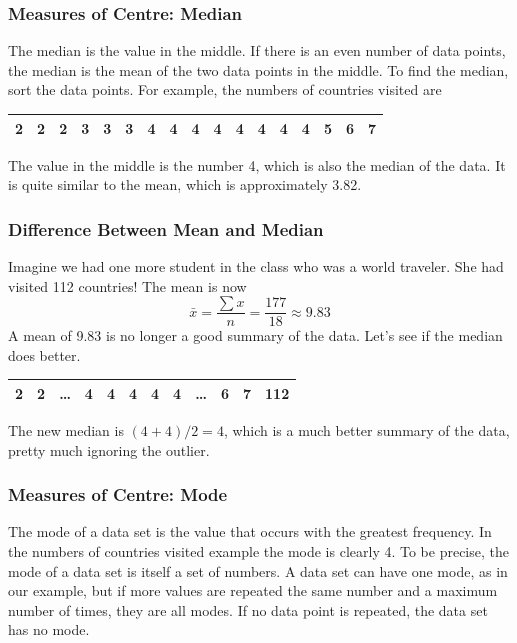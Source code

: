 \documentclass[xcolor=dvipsnames]{beamer}
\begin{document}
\begin{frame}
  \frametitle{Measures of Centre: Median}
The median is the value in the middle. If there is an even number of
data points, the median is the mean of the two data points in the
middle. To find the median, sort the data points. For example, the
numbers of countries visited are

\medskip

\begin{tabular}{|c|c|c|c|c|c|c|c|c|c|c|c|c|c|c|c|c|}\hline
2&2&2&3&3&3&4&4&\alert{4}&4&4&4&4&4&5&6&7 \\ \hline
\end{tabular}

\medskip

The value in the middle is the number 4, which is also the median of
the data. It is quite similar to the mean, which is approximately 3.82.
\end{frame}

\begin{frame}
  \frametitle{Difference Between Mean and Median}
Imagine we had one more student in the class who was a world traveler.
She had visited 112 countries! The mean is now
\begin{equation}
  \label{eq:zephahwu}
  \bar{x}=\frac{\sum{}x}{n}=\frac{177}{18}\approx{}9.83
\end{equation}
A mean of 9.83 is no longer a good summary of the data. Let's see if
the median does better.

\medskip

\begin{tabular}{|c|c|c|c|c|c|c|c|c|c|c|c|}\hline
2&2&{\ldots}&4&4&\alert{4}&\alert{4}&4&{\ldots}&6&7&112 \\ \hline
\end{tabular}

\medskip

The new median is $(4+4)/2=4$, which is a much better summary of the
data, pretty much ignoring the outlier.
\end{frame}

\begin{frame}
  \frametitle{Measures of Centre: Mode}
The \alert{mode} of a data set is the value that occurs with the
greatest frequency. In the numbers of countries visited example the
mode is clearly 4. To be precise, the mode of a data set is itself a
set of numbers. A data set can have one mode, as in our example, but
if more values are repeated the same number and a maximum number of
times, they are all modes. If no data point is repeated, the data set
has no mode.
\end{frame}
\end{document}
